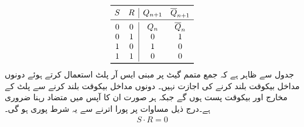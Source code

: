  \begin{align*}
 \begin{array}{cc|cc}
 \toprule
 S&R&Q_{n+1}&\overline{Q}_{n+1}\\
 \midrule
 0&0&Q_n&\overline{Q}_n\\
 0&1&0&1\\
 1&0&1&0\\
 1&1&0&0\\
 \bottomrule
 \end{array}
\end{align*}
 جدول سے ظاہر ہے کہ جمع متمم گیٹ پر مبنی ایس آر پلٹ استعمال کرتے ہوئے دونوں مداخل بیکوقت بلند کرنے کی اجازت نہیں۔ دونوں مداخل بیکوقت بلند کرنے سے پلٹ کے مخارج  اور  بیکوقت پست ہوں گے جبکہ ہر صورت ان کا آپس میں متضاد رہنا ضروری ہے۔درج ذیل مساوات پر پورا اترنے سے یہ شرط پوری ہو گی۔
 \begin{align}
 S\cdot R=0
 \end{align}
%

